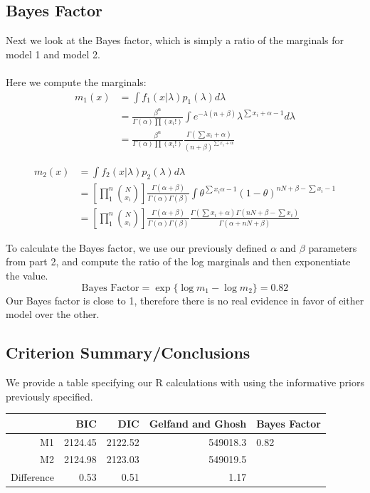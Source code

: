 \documentclass[a4paper, 9pt]{article}
\begin{document}
\begin{enumerate}
\subsection*{Bayes Factor}
Next we look at the Bayes factor, which is simply a ratio of the marginals for model 1 and model 2.
\\
\\
Here we compute the marginals:
\begin{align}
m_1(x) &= \int f_1(x|\lambda) p_1(\lambda)d\lambda\\
&= \frac{\beta^\alpha}{\Gamma(\alpha) \prod (x_i!)} \int e^{-\lambda(n + \beta)} \lambda^{\sum x_i + \alpha - 1}d\lambda\\
&= \frac{\beta^\alpha}{\Gamma(\alpha) \prod (x_i!)} \frac{\Gamma(\sum x_i + \alpha)}{(n + \beta)^{\sum x_i + \alpha}}
\end{align}

\begin{align}
    m_2(x) &= \int f_2(x|\lambda) p_2(\lambda)d\lambda\\
    &=\left[ \prod_1^{n} {{N}\choose{x_i}}\right]\frac{\Gamma(\alpha + \beta)}{\Gamma(\alpha)\Gamma(\beta)} \int \theta^{\sum x_i  \alpha - 1} (1-\theta)^{nN + \beta - \sum x_i -  1}\\
    &=\left[ \prod_1^{n} {{N}\choose{x_i}}\right]\frac{\Gamma(\alpha + \beta)}{\Gamma(\alpha)\Gamma(\beta)} \frac{\Gamma(\sum x_i + \alpha) \Gamma(nN + \beta - \sum x_i)}{\Gamma(\alpha +nN + \beta)}
\end{align}

To calculate the Bayes factor, we use our previously defined $\alpha$ and $\beta$ parameters from part 2, and compute the ratio of the log marginals and then exponentiate the value.
$$\text{Bayes Factor} = \exp\{\log m_1 - \log m_2\} = 0.82 $$
Our Bayes factor is close to 1, therefore there is no real evidence in favor of either model over the other.

\subsection*{Criterion Summary/Conclusions}

We provide a table specifying our R calculations with using the informative priors previously specified.


\begin{table}[h!]
\centering
\begin{tabular}{rrrrl}
  \hline
 & BIC & DIC & Gelfand and Ghosh & Bayes Factor \\ 
  \hline
M1 & 2124.45 & 2122.52 & 549018.3 & 0.82 \\ 
  M2 & 2124.98 & 2123.03 & 549019.5 &          \\ 
  Difference & 0.53 & 0.51 & 1.17 &          \\ 
   \hline
\end{tabular}
\end{table}

\end{enumerate}
\end{document}
